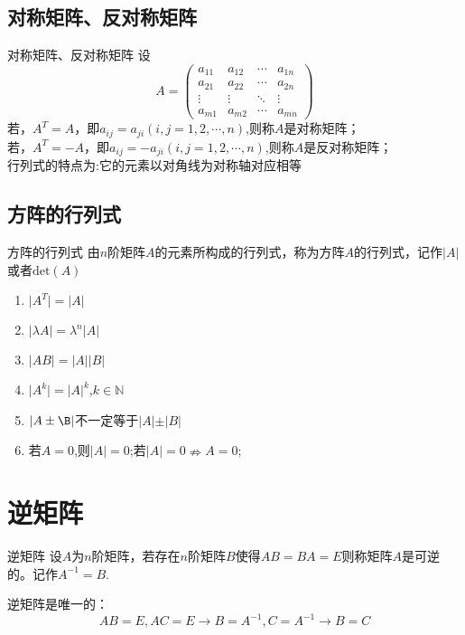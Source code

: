 \documentclass[lang=cn,10pt]{elegantbook}
\begin{document}
\subsection{对称矩阵、反对称矩阵}

\begin{definition}{对称矩阵、反对称矩阵}
   设\begin{equation}
    A = \begin{pmatrix}
      a_{11}&a_{12}& \cdots & a_{1n}\\
       a_{21}&a_{22}& \cdots & a_{2n}\\
       \vdots&\vdots& \ddots  &\vdots\\
       a_{m1}&a_{m2}& \cdots & a_{mn}
\end{pmatrix}
\end{equation}
若，$A^T =A$，即$a_{ij}=a_{ji}(i,j = 1,2,\cdots ,n)$,则称$A$是对称矩阵；\\
若，$A^T =-A$，即$a_{ij}=-a_{ji}(i,j = 1,2,\cdots ,n)$,则称$A$是反对称矩阵；\\
行列式的特点为:它的元素以对角线为对称轴对应相等
\end{definition}

\subsection{方阵的行列式}
\begin{definition}{方阵的行列式}
由$n$阶矩阵$A$的元素所构成的行列式，称为方阵$A$的行列式，记作$\vert A \vert$或者$\mathrm{det}(A)$
\end{definition}
\begin{property}
    \begin{enumerate}
        \item $\vert A^T \vert = \vert A \vert$
        \item $\vert \lambda A \vert = \lambda^n \vert A \vert$
        \item $\vert AB \vert = \vert A \vert \vert B \vert$
        \item $\vert A^k \vert = \vert A \vert ^k $,$k \in \mathbb{N}$
        \item $\vert A \pm \B \vert$不一定等于$\vert A \vert \pm \vert B \vert$
        \item 若$A = 0$,则$\vert A \vert = 0$;若$\vert A \vert=0 \nRightarrow A = 0$;
    \end{enumerate}
\end{property}


\section{逆矩阵}
\begin{definition}{逆矩阵}
    设$A$为$n$阶矩阵，若存在$n$阶矩阵$B$使得$AB =BA =E$则称矩阵$A$是可逆的。记作$A^{-1}=B$.
\end{definition}
\begin{property}
逆矩阵是唯一的：
\begin{equation}
    AB =  E,AC=E \to B = A^{-1},C = A^{-1} \to B =C
\end{equation}
\end{property}
\end{document}
